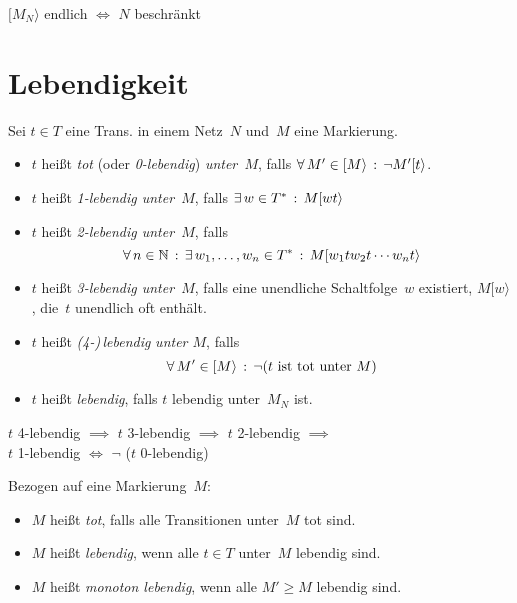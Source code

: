\documentclass{cheat-sheet}
\newcommand{\activeTransition}[1]{[{#1}\rangle} %
\begin{document}
\begin{prop}
  $\activeTransition{M_N}$ endlich $\iff$ $N$ beschränkt
\end{prop}


\section{Lebendigkeit}

\begin{defn}
  Sei $t \in T$ eine Trans. in einem Netz~$N$ und~$M$ eine Markierung.
  \begin{itemize}
    \item $t$ heißt \emph{tot} (oder \textit{0-lebendig}) \textit{unter~$M$}, falls $\fa{M' \in \activeTransition{M}} \neg M' \activeTransition{t}$.
    \item $t$ heißt \textit{1-lebendig unter~$M$}, falls $\ex{w \in T^*} M \activeTransition{w t}$
    \item $t$ heißt \textit{2-lebendig unter~$M$}, falls
    \[ \fa{n \in \N} \ex{w_1, \ldots, w_n \in T^*} M \activeTransition{w_1 t w_2 t \cdots w_n t} \]
    \item $t$ heißt \textit{3-lebendig unter~$M$}, falls eine unendliche Schaltfolge~$w$ existiert, $M \activeTransition{w}$, die~$t$ unendlich oft enthält.
    \item $t$ heißt \emph{(4-)\,lebendig} \textit{unter $M$}, falls
    \[ \fa{M' \in \activeTransition{M}} \neg (t \text{ ist tot unter~$M$}) \]
    \item $t$ heißt \textit{lebendig}, falls $t$ lebendig unter~$M_N$ ist.
  \end{itemize}
\end{defn}

\begin{bem}
  \begin{minipage}[t]{0.8 \linewidth}
    $t$ 4-lebendig $\implies$ $t$ 3-lebendig $\implies$ $t$ 2-lebendig $\implies$ \\
    $t$ 1-lebendig $\iff$ $\neg$ ($t$ 0-lebendig)
  \end{minipage}
\end{bem}

\begin{defn}
  Bezogen auf eine Markierung~$M$:
  \begin{itemize}
    \item $M$ heißt \textit{tot}, falls alle Transitionen unter~$M$ tot sind.
    \item $M$ heißt \textit{lebendig}, wenn alle $t \in T$ unter~$M$ lebendig sind.
    \item $M$ heißt \emph{monoton lebendig}, wenn alle $M' \geq M$ lebendig sind.
  \end{itemize}
\end{defn}
\end{document}
